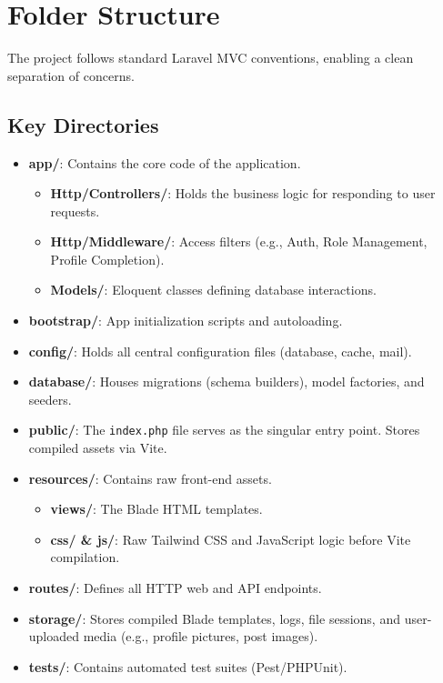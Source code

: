 \section{Folder Structure}
The project follows standard Laravel MVC conventions, enabling a clean separation of concerns.

\subsection{Key Directories}
\begin{itemize}
    \item \textbf{app/}: Contains the core code of the application.
    \begin{itemize}
        \item \textbf{Http/Controllers/}: Holds the business logic for responding to user requests.
        \item \textbf{Http/Middleware/}: Access filters (e.g., Auth, Role Management, Profile Completion).
        \item \textbf{Models/}: Eloquent classes defining database interactions.
    \end{itemize}
    \item \textbf{bootstrap/}: App initialization scripts and autoloading.
    \item \textbf{config/}: Holds all central configuration files (database, cache, mail).
    \item \textbf{database/}: Houses migrations (schema builders), model factories, and seeders.
    \item \textbf{public/}: The \texttt{index.php} file serves as the singular entry point. Stores compiled assets via Vite.
    \item \textbf{resources/}: Contains raw front-end assets.
    \begin{itemize}
        \item \textbf{views/}: The Blade HTML templates.
        \item \textbf{css/ \& js/}: Raw Tailwind CSS and JavaScript logic before Vite compilation.
    \end{itemize}
    \item \textbf{routes/}: Defines all HTTP web and API endpoints. 
    \item \textbf{storage/}: Stores compiled Blade templates, logs, file sessions, and user-uploaded media (e.g., profile pictures, post images).
    \item \textbf{tests/}: Contains automated test suites (Pest/PHPUnit).
\end{itemize}
